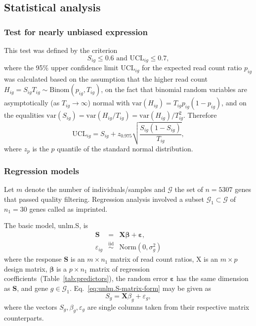 \documentclass[letterpaper]{article}
\begin{document}
\subsection{Statistical analysis}

\subsubsection{Test for nearly unbiased expression}

This test was defined by the criterion
\begin{equation}
S_{ig} \le 0.6 \text{ and } \mathrm{UCL}_{ig} \le 0.7,
\label{eq:unbiased-test}
\end{equation}
where the 95\% upper confidence limit \(\mathrm{UCL}_{ig}\) for the expected
read count ratio \(p_{ig}\) was calculated based on the assumption
that the higher read count \(H_{ig}=S_{ig}T_{ig}\sim \mathrm{Binom}(p_{ig},
T_{ig})\), on the fact that binomial random variables are
asymptotically (as \(T_{ig}\rightarrow \infty\)) normal with
\(\mathrm{var}(H_{ig}) = T_{ig}p_{ig}(1-p_{ig})\), and on the equalities
\(\mathrm{var}(S_{ig}) = \mathrm{var}(H_{ig}/T_{ig}) =
\mathrm{var}(H_{ig})/T_{ig}^2\).  Therefore
\begin{equation}
\mathrm{UCL}_{ig} = S_{ig} + z_{0.975} \sqrt{\frac{S_{ig} (1 - S_{ig})}{T_{ig}}},
\end{equation}
where $z_{p}$ is the $p$ quantile of the standard normal distribution.

\subsubsection{Regression models}
\label{sec:methods-regression}

Let \(m\) denote the number of individuals/samples and \(\mathcal{G}\) the set
of \(n=5307\) genes that passed quality filtering.  Regression analysis
involved a subset \(\mathcal{G}_1\subset\mathcal{G}\) of \(n_1=30\) genes
called as imprinted.

The basic model, unlm.S, is
\begin{eqnarray}
\mathbf{S} &=& \mathbf{X} \boldsymbol{\beta} + \boldsymbol{\varepsilon},
\label{eq:unlm.S-matrix-form} \\
\varepsilon_{ig} &\overset{\mathrm{iid}}{\sim}& \mathrm{Norm}(0, \sigma^2_g)
\end{eqnarray}
where the response \(\mathbf{S}\) is an \(m\times n_1\) matrix of read count ratios,
\(\mathrm{X}\) is an \(m\times p\) design matrix, \(\boldsymbol{\beta}\) is a \(p\times n_1\) matrix of regression
coefficients~(Table~\ref{tab:predictors}), the random error \(\boldsymbol{\varepsilon}\) has the same
dimension as \(\mathbf{S}\), and gene \(g\in \mathcal{G}_1\).  Eq.~\ref{eq:unlm.S-matrix-form} may be given as
\begin{equation}
S_g = \mathbf{X} \beta_g + \varepsilon_g,
\label{eq:unlm.S-vector-form}
\end{equation}
where the vectors \(S_g, \beta_g, \varepsilon_g\)
are single columns taken from their respective matrix counterparts.
\end{document}
